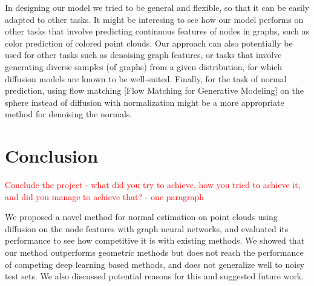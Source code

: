 \documentclass{acmart}
\begin{document}
In designing our model we tried to be general and flexible, so that it can be easily adapted to other tasks. It might be interesing to see how our model performs on other tasks that involve predicting continuous features of nodes in graphs, such as color prediction of colored point clouds. Our approach can also potentially be used for other tasks such as denoising graph features, or tasks that involve generating diverse samples (of graphs) from a given distribution, for which diffusion models are known to be well-suited.
Finally, for the task of normal prediction, using flow matching [Flow Matching for Generative Modeling] on the sphere instead of diffusion with normalization might be a more appropriate method for denoising the normals.

\section{Conclusion}
\textcolor{red}{Conclude the project - what did you try to achieve, how you tried to achieve it, and did you manage to achieve that?  - one paragraph}

We proposed a novel method for normal estimation on point clouds using diffusion on the node features with graph neural networks, and evaluated its performance to see how competitive it is with existing methods. We showed that our method outperforms geometric methods but does not reach the performance of competing deep learning based methods, and does not generalize well to noisy test sets. We also discussed potential reasons for this and suggested future work.



\end{document}
